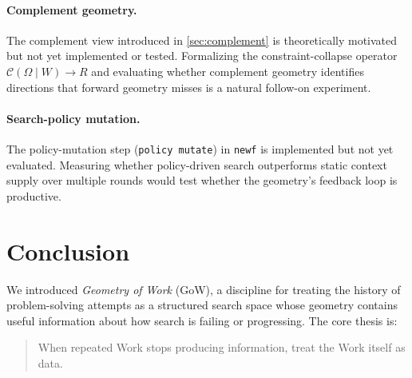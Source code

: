 \documentclass[11pt]{article}
\theoremstyle{gowthm}
\theoremstyle{gowplain}
\begin{document}
\paragraph{Complement geometry.}
The complement view introduced in \cref{sec:complement} is theoretically
motivated but not yet implemented or tested. Formalizing the constraint-collapse
operator $\mathcal{C}(\Omega \mid W) \to R$ and evaluating whether complement
geometry identifies directions that forward geometry misses is a natural
follow-on experiment.

\paragraph{Search-policy mutation.}
The policy-mutation step (\texttt{policy mutate}) in \texttt{newf} is
implemented but not yet evaluated. Measuring whether policy-driven search
outperforms static context supply over multiple rounds would test whether the
geometry's feedback loop is productive.

\section{Conclusion}
\label{sec:conclusion}

We introduced \emph{Geometry of Work} (GoW), a discipline for treating the
history of problem-solving attempts as a structured search space whose geometry
contains useful information about how search is failing or progressing. The
core thesis is:

\begin{quote}
When repeated Work stops producing information, treat the Work itself as data.
\end{quote}
\end{document}
